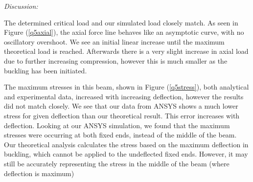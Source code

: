 \documentclass[11pt]{article}
\begin{document}
\textit{Discussion:}

The determined critical load and our simulated load closely match. As seen in Figure (\ref{q5axial}), the axial force line behaves like an asymptotic curve, with no oscillatory overshoot. We see an initial linear increase until the maximum theoretical load is reached. Afterwards there is a very slight increase in axial load due to further increasing compression, however this is much smaller as the buckling has been initiated.

The maximum stresses in this beam, shown in Figure (\ref{q5stress}), both analytical and experimental data, increased with increasing deflection, however the results did not match closely. We see that our data from ANSYS shows a much lower stress for given deflection than our theoretical result. This error increases with deflection. Looking at our ANSYS simulation, we found that the maximum stresses were occurring at both fixed ends, instead of the middle of the beam. Our theoretical analysis calculates the stress based on the maximum deflection in buckling, which cannot be applied to the undeflected fixed ends. However, it may still be accurately representing the stress in the middle of the beam (where deflection is maximum)
\end{document}
